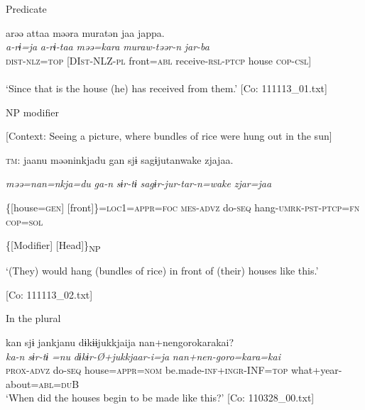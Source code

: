 \ex \label{ex:7:3b}Predicate

\gllll  arəə  attaa  məəra  muratən  jaa  jappa.\\
\textit{a-rɨ=ja}  \textit{a-rɨ-taa}  \textit{məə=kara}  \textit{muraw-təər-n}  \textit{}  \textit{jar-ba}\\
\textsc{dist}-\textsc{nlz}=\textsc{top}  [DI\textsc{st}-NLZ-\textsc{pl}  front=\textsc{abl}  receive-\textsc{rsl}-\textsc{ptcp}  house                               \textsc{cop}-\textsc{csl}]\\
[Nominal predicate]\\
\glt ‘Since that is the house (he) has received from them.’ [Co: 111113\_01.txt]

\ex \label{ex:7:3c}NP modifier

    [Context: Seeing a picture, where bundles of rice were hung out in the sun]

    \textsc{tm}:  jaanu  məəninkjadu  gan  sjɨ   sagɨjutanwake  zjajaa.

      \textit{}  \textit{məə=nan=nkja=du}  \textit{ga-n}  \textit{sɨr-tɨ} \textit{sagɨr-jur-tar-n=wake}  \textit{zjar=jaa}
                                                                                
      \{[house=\textsc{gen}]  [front]\}=\textsc{loc}1=\textsc{appr}=\textsc{foc}  \textsc{mes}-\textsc{advz}  do-\textsc{seq}                  hang-\textsc{umrk}-\textsc{pst}-\textsc{ptcp}=\textsc{fn}  \textsc{cop}=\textsc{sol}

      \{[Modifier]  [Head]\}\textsubscript{NP}    

      ‘(They) would hang (bundles of rice) in front of (their) houses like this.’

      [Co: 111113\_02.txt]

\ex \label{ex:7:3d}In the plural

\glll  kan  sjɨ  jankjanu  dɨkɨɨjukkjaija {\textbar}nan+nengoro{\textbar}karakai?\\
\textit{ka-n}  \textit{sɨr-tɨ}  \textit{=nu}  \textit{dɨkɨr-Ø+jukkjaar-i=ja}  \textit{nan+nen-goro=kara=kai}\\
\textsc{prox}-\textsc{advz}  do-\textsc{seq}  house=\textsc{appr}=\textsc{nom}  be.made-\textsc{inf}+\textsc{ingr}-INF=\textsc{top}  what+year-about=\textsc{abl}=\textsc{du}B\\
\glt ‘When did the houses begin to be made like this?’ [Co: 110328\_00.txt]
\z
\z

